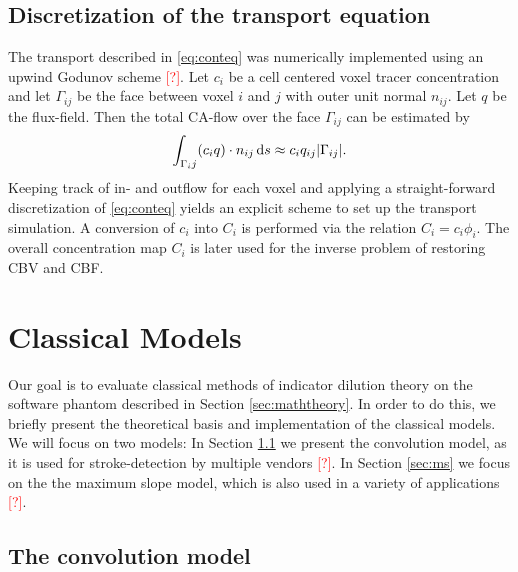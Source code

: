 \documentclass[paper=a4, fontsize=12pt,parskip=half,headings=small]{scrartcl}
\newcommand{\missingsource}{\textcolor{red}{[?]}}
\begin{document}
	\subsection{Discretization of the transport equation} \label{sec:numtrans}
	The transport described in \eqref{eq:conteq} was numerically implemented using an upwind Godunov scheme \missingsource.
	Let $c_i$ be a cell centered voxel tracer concentration and let $\Gamma_{ij}$ be the face between voxel $i$ and $j$ with outer unit normal $n_{ij}$.
	Let $q$ be the flux-field. 
	Then the total CA-flow over the face $\Gamma_{ij}$ can be estimated by
	\[
		\int_{\Gamma_ij} (c_i q)\cdot n_{ij} \,\mathrm{d} s \approx c_i q_{ij} \vert \Gamma_{ij} \vert.
	\]
	Keeping track of in- and outflow for each voxel and applying a straight-forward discretization of \eqref{eq:conteq} yields an explicit scheme to set up the transport simulation.
	A conversion of $c_i$ into $C_i$ is performed via the relation $C_i = c_i\phi_i$. 
	The overall concentration map $C_i$ is later used for the inverse problem of restoring CBV and CBF.



	\section{Classical Models} \label{sec:classical}
	
	Our goal is to evaluate classical methods of indicator dilution theory on the software phantom described in Section \ref{sec:maththeory}.
	In order to do this, we briefly present the theoretical basis and implementation of the classical models.
	We will focus on two models:
	In Section \ref{sec:conv} we present the convolution model, as it is used for stroke-detection by multiple vendors \missingsource.
	In Section \ref{sec:ms} we focus on the the maximum slope model, which is also used in a variety of applications \missingsource.

	\subsection{The convolution model}\label{sec:conv}
	
\end{document}
